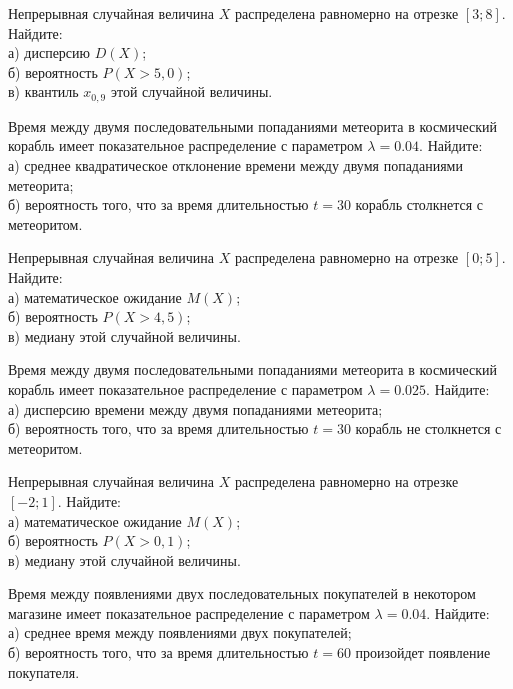 \vfill

\newpage\setcounter{zad}{0}

\z Непрерывная случайная величина $X$ распределена равномерно на отрезке $[3; 8]$. Найдите: \\ \quad а) дисперсию $D(X)$; \\ \quad б) вероятность $P(X>5{,}0)$; \\ \quad в) квантиль $x_{0{,}9}$ этой случайной величины.


\vfill

\z Время между двумя последовательными попаданиями метеорита в космический корабль имеет показательное распределение с параметром $\lambda = 0.04$. Найдите: \\ \quad а) среднее квадратическое отклонение времени между двумя попаданиями метеорита; \\ \quad б) вероятность того, что за время длительностью $t = 30$ корабль  столкнется с метеоритом.
 

\vfill

\newpage\setcounter{zad}{0}

\z Непрерывная случайная величина $X$ распределена равномерно на отрезке $[0; 5]$. Найдите: \\ \quad а) математическое ожидание $M(X)$; \\ \quad б) вероятность $P(X>4{,}5)$; \\ \quad в) медиану этой случайной величины.


\vfill

\z Время между двумя последовательными попаданиями метеорита в космический корабль имеет показательное распределение с параметром $\lambda = 0.025$. Найдите: \\ \quad а) дисперсию времени между двумя попаданиями метеорита; \\ \quad б) вероятность того, что за время длительностью $t = 30$ корабль не столкнется с метеоритом.
 

\vfill

\newpage\setcounter{zad}{0}

\z Непрерывная случайная величина $X$ распределена равномерно на отрезке $[-2; 1]$. Найдите: \\ \quad а) математическое ожидание $M(X)$; \\ \quad б) вероятность $P(X>0{,}1)$; \\ \quad в) медиану этой случайной величины.


\vfill

\z Время между появлениями двух последовательных покупателей в некотором магазине имеет показательное распределение с параметром $\lambda = 0.04$. Найдите: \\ \quad а) среднее время между появлениями двух покупателей; \\ \quad б) вероятность того, что за время длительностью $t = 60$  произойдет появление покупателя.
 

